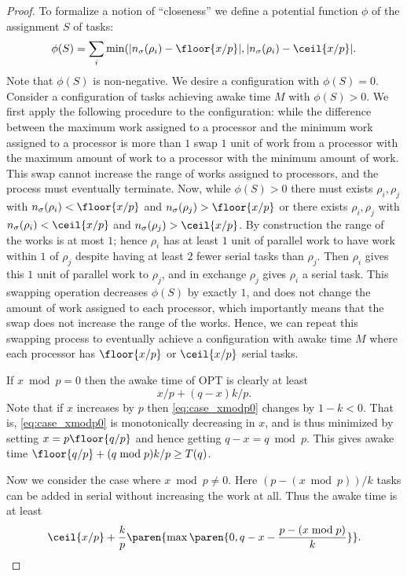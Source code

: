 \begin{proof}
  To formalize a notion of \enquote{closeness} we define a potential 
  function $\phi$ of the assignment $S$ of tasks:
  $$\phi(S) = \sum_{i} \min(|n_\sigma(\rho_i)-\floor{x/p}|, |n_\sigma(\rho_i)-\ceil{x/p}|.$$ 
  Note that $\phi(S)$ is non-negative. We desire a configuration with $\phi(S) = 0$.
  Consider a configuration of tasks achieving awake time $M$ with $\phi(S) > 0$.
  We first apply the following procedure to the configuration:
  while the difference between the maximum work assigned to a
  processor and the minimum work assigned to a processor is more
  than $1$ swap $1$ unit of work from a processor with the
  maximum amount of work to a processor with the minimum amount
  of work. This swap cannot increase the range of works assigned
  to processors, and the process must eventually terminate.
  Now, while $\phi(S) > 0$ there must 
  exists $\rho_i, \rho_j$ with $n_\sigma(\rho_i) < \floor{x/p}$
  and $n_\sigma(\rho_j) > \floor{x/p}$ or there exists $\rho_i,
  \rho_j$ with $n_\sigma(\rho_i) < \ceil{x/p}$ and
  $n_\sigma(\rho_j) > \ceil{x/p}$. By construction the range of
  the works is at most $1$; hence $\rho_i$ has at least $1$ unit
  of parallel work to have work within $1$ of $\rho_j$ despite
  having at least $2$ fewer serial tasks than $\rho_j$. Then
  $\rho_i$ gives this $1$ unit of parallel work to $\rho_j$, and
  in exchange $\rho_j$ gives $\rho_i$ a serial task. This
  swapping operation decreases $\phi(S)$ by exactly $1$, and does
  not change the amount of work assigned to each processor, which
  importantly means that the swap does not increase the range of
  the works. Hence, we can repeat this swapping process to
  eventually achieve a configuration with awake time $M$ where each 
  processor has $\floor{x/p}$ or $\ceil{x/p}$ serial tasks.

  If $x\bmod p = 0$ then the awake time of OPT is clearly at
  least 
  \begin{equation} \label{eq:case_xmodp0}
    x/p + (q-x)k/p.
  \end{equation}
  Note that if $x$ increases by $p$ then \eqref{eq:case_xmodp0}
  changes by $1-k < 0$. That is, \eqref{eq:case_xmodp0} is
  monotonically decreasing in $x$, and is thus minimized by
  setting $x = p\floor{q/p}$ and hence getting $q-x = q\bmod p$.
  This gives awake time $\floor{q/p} + (q\bmod p)k/p \ge T(q)$.

  Now we consider the case where $x\bmod p \neq 0$. Here $(p -
  (x\bmod p))/k$ tasks can be added in serial without
  increasing the work at all. Thus the awake time is at least
  \begin{equation} \label{eq:case_xmodpnot0}
    \ceil{x/p} + \frac{k}{p}\paren{\max\paren{0, q-x - \frac{p-(x\bmod p)}{k}}}.
  \end{equation}


\end{proof}
